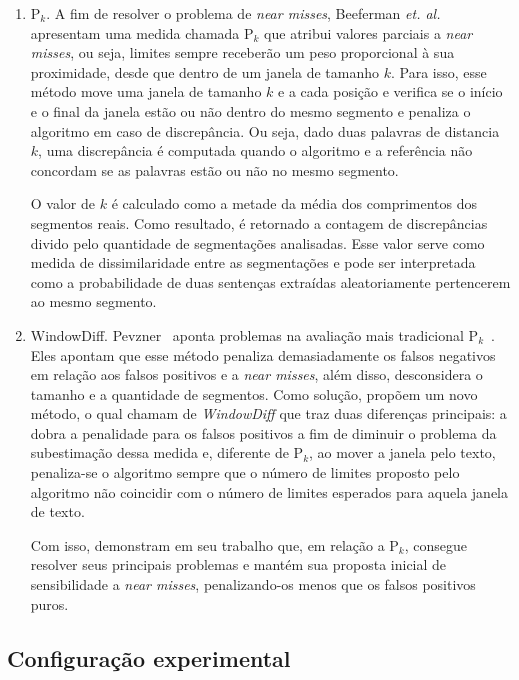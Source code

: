 \begin{enumerate}

	\item P$_k$. A fim de resolver o problema de \textit{near misses}, Beeferman \textit{et. al.}~\cite{Beeferman1999} apresentam uma medida chamada P$_k$ que atribui 
%
valores parciais a \textit{near misses}, 
%
ou seja, limites sempre receberão um peso proporcional à sua proximidade, desde que dentro de um janela de tamanho $k$.
%
Para isso, esse método move uma janela de tamanho $k$ e a cada posição e verifica se o início e o final da janela estão ou não dentro do mesmo segmento e penaliza o algoritmo em caso de discrepância. Ou seja, dado duas palavras de distancia $k$, uma discrepância é computada quando o algoritmo e a referência não concordam se as palavras estão ou não no mesmo segmento.

O valor de $k$ é calculado como a metade da média dos comprimentos dos segmentos reais. Como resultado, é retornado a contagem de discrepâncias divido pelo quantidade de segmentações analisadas. Esse valor serve como medida de dissimilaridade entre as segmentações e pode ser interpretada como a probabilidade de duas sentenças extraídas aleatoriamente pertencerem ao mesmo segmento.

\item WindowDiff. Pevzner~\cite{Pevzner2002} aponta problemas na avaliação mais tradicional P$_k$~\cite{Beeferman1999}. Eles apontam que esse método penaliza demasiadamente os falsos negativos em relação aos falsos positivos e a \textit{near misses}, além disso, desconsidera o tamanho e a quantidade de segmentos. Como solução, propõem um novo método, o qual chamam de \textit{WindowDiff} que traz duas diferenças principais: a dobra a penalidade para os falsos positivos a fim de diminuir o problema da subestimação dessa medida e, diferente de P$_k$, ao mover a janela pelo texto, penaliza-se o algoritmo sempre que o número de limites proposto pelo algoritmo não coincidir com o número de limites esperados para aquela janela de texto. 

Com isso, demonstram em seu trabalho que, em relação a P$_k$, consegue resolver seus principais problemas e mantém sua proposta inicial de sensibilidade a \textit{near misses}, penalizando-os menos que os falsos positivos puros.


\end{enumerate}

\subsection{Configuração experimental}
	\label{subsec:configuracaoexperimental}

